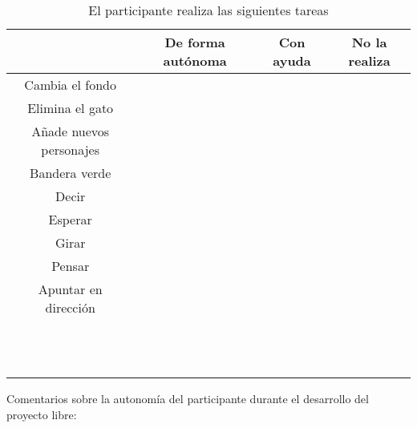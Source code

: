 \documentclass[a4paper,10pt]{article}
\begin{document}
\begin{table}[H]
\centering
\caption{El participante realiza las siguientes tareas}
\label{my-label}
\begin{tabular}{cccc}
\hline
 & De forma autónoma & Con ayuda & No la realiza\\ \hline
Cambia el fondo &  &  & \\
Elimina el gato &  &  &\\
Añade nuevos personajes &  &  &\\
Bandera verde &  &  &\\
Decir &  &  &\\
Esperar &  &  &\\
Girar &  &  &\\
Pensar &  &  &\\
Apuntar en dirección &  &  &\\ 
 &  &  &\\
 &  &  &\\
 &  &  &\\
 &  &  &\\
 &  &  &\\
 &  &  &\\
 &  &  &\\
 &  &  &\\
 &  &  &\\
 &  &  &\\
 &  &  &\\
 &  &  &\\
\hline
\end{tabular}
\end{table}

Comentarios sobre la autonomía del participante durante el desarrollo del proyecto libre:
\end{document}
